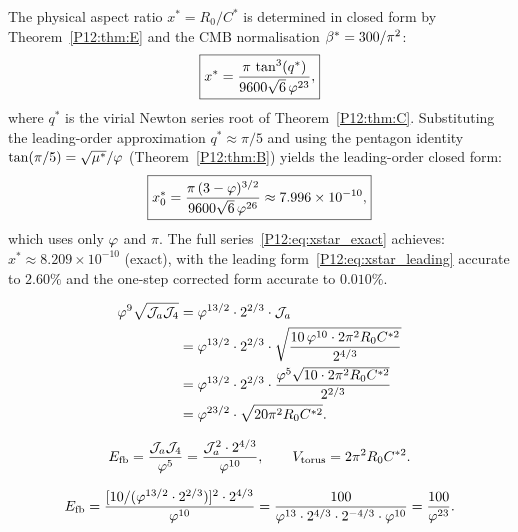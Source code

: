 \begin{corollary}[Closed form for $x^*=R_0/C^*$]
\label{P12:cor:xstar}
The physical aspect ratio $x^*=R_0/C^*$ is determined in closed form
by Theorem~\ref{P12:thm:E} and the CMB normalisation $\beta^{*}=300/\pi^2$:
\begin{equation}
  \boxed{x^* = \frac{\pi\,\tan^3(q^*)}{9600\sqrt{6}\,\varphi^{23}},}
  \label{P12:eq:xstar_exact}
\end{equation}
where $q^*$ is the virial Newton series root of Theorem~\ref{P12:thm:C}.
Substituting the leading-order approximation $q^*\approx\pi/5$ and
using the pentagon identity $\tan(\pi/5)=\sqrt{\mu^*}/\varphi$
(Theorem~\ref{P12:thm:B}) yields the leading-order closed form:
\begin{equation}
  \boxed{x^*_0 = \frac{\pi\,(3-\varphi)^{3/2}}{9600\sqrt{6}\,\varphi^{26}}
  \approx 7.996\times10^{-10},}
  \label{P12:eq:xstar_leading}
\end{equation}
which uses only $\varphi$ and $\pi$.
The full series~\eqref{P12:eq:xstar_exact} achieves:
$x^*\approx8.209\times10^{-10}$ (exact),
with the leading form~\eqref{P12:eq:xstar_leading} accurate to $2.60\%$
and the one-step corrected form accurate to $0.010\%$.
\end{corollary}

\begin{align}
  \varphi^9\sqrt{\mathcal{J}_a\mathcal{J}_4}
  &= \varphi^{13/2}\cdot2^{2/3}\cdot\mathcal{J}_a \notag\\
  &= \varphi^{13/2}\cdot2^{2/3}
     \cdot\sqrt{\frac{10\,\varphi^{10}\cdot 2\pi^2 R_0 C^{*2}}{2^{4/3}}} \notag\\
  &= \varphi^{13/2}\cdot2^{2/3}\cdot
     \frac{\varphi^5\sqrt{10\cdot 2\pi^2 R_0 C^{*2}}}{2^{2/3}} \notag\\
  &= \varphi^{23/2}\cdot\sqrt{20\pi^2 R_0 C^{*2}}.
  \label{P12:eq:Bimplies}
\end{align}

\begin{equation}
  E_{\mathrm{fb}} = \frac{\mathcal{J}_a\mathcal{J}_4}{\varphi^5}
       = \frac{\mathcal{J}_a^2\cdot2^{4/3}}{\varphi^{10}},
  \qquad
  V_{\mathrm{torus}} = 2\pi^2 R_0 C^{*2}.
  \label{P12:eq:EV}
\end{equation}

\begin{equation}
  E_{\mathrm{fb}} = \frac{[10/(\varphi^{13/2}\cdot2^{2/3})]^2\cdot2^{4/3}}{\varphi^{10}}
       = \frac{100}{\varphi^{13}\cdot2^{4/3}\cdot2^{-4/3}\cdot\varphi^{10}}
       = \frac{100}{\varphi^{23}}.
  \label{P12:eq:Efb_value}
\end{equation}

